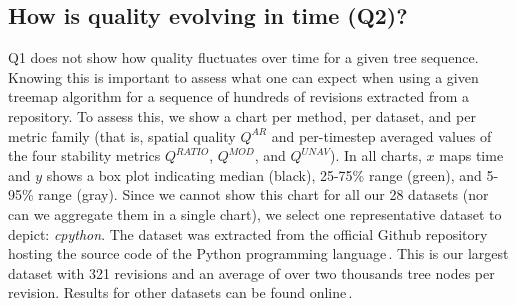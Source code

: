 \subsection{How is quality evolving in time (Q2)?}
\label{sec:q2}
%
%
Q1 does not show how quality fluctuates over time for a given tree sequence. Knowing this is important to assess what one can expect when using a given treemap algorithm for a sequence of hundreds of revisions extracted from a repository. To assess this, we show a chart per method, per dataset, and per metric family (that is, spatial quality $Q^{AR}$ and per-timestep averaged values of the four stability metrics $Q^{RATIO}$, $Q^{MOD}$, and $Q^{UNAV}$). In all charts, $x$ maps time and $y$ shows a box plot indicating median (black), 25-75\% range (green), and 5-95\% range (gray). Since we 
cannot show this chart for all our 28 datasets (nor can we aggregate them in a single chart), we select one representative dataset to depict: \emph{cpython}. The dataset was extracted from the official Github repository hosting the source code of the Python programming language\,\citep{cpython}. This is our largest dataset with 321 revisions and an average of over two thousands tree nodes per revision. Results for other datasets can be found online\,\citep{benchmark}.

